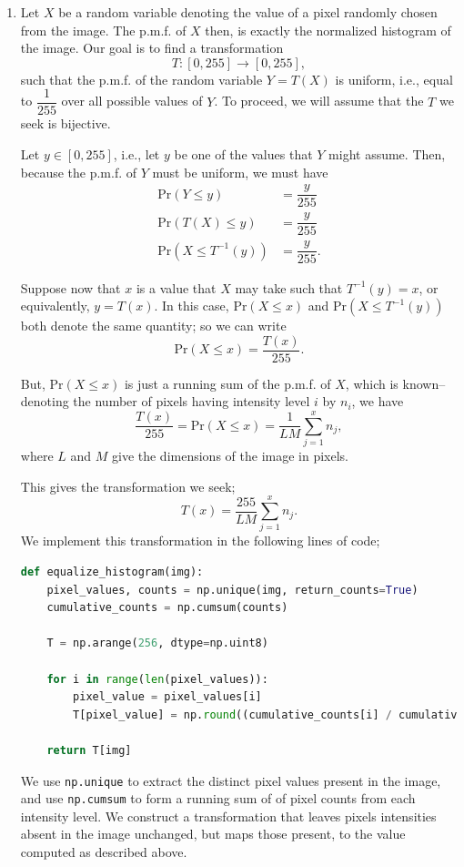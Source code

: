 \documentclass{article}[a4paper]
\begin{document}
\begin{enumerate}
	\item Let $X$ be a random variable denoting the value of a pixel randomly chosen from the image. The p.m.f. of $X$ then, is exactly
	the normalized histogram of the image. Our goal is to find a transformation \[
		T:[0, 255] \to [0, 255],
	\] such that the p.m.f. of the random variable $Y=T(X)$ is uniform, i.e., equal to $\dfrac{1}{255}$ over all possible values of $Y$.
	To proceed, we will assume that the $T$ we seek is bijective.
	
	Let $y \in [0, 255]$, i.e., let $y$ be one of the values that $Y$ might assume. Then, because the p.m.f. of $Y$ must be uniform, we must have
	\begin{align*}
		\text{Pr}\left( Y \leq y \right) &= \dfrac{y}{255} \\
		\text{Pr}\left( T(X) \leq y \right) &= \dfrac{y}{255} \\
		\text{Pr}\left( X \leq T^{-1}(y) \right) &= \dfrac{y}{255}.
	\end{align*}
	
	Suppose now that $x$ is a value that $X$ may take such that $T^{-1}(y) = x$, or equivalently, $y = T(x)$. In this case, $\text{Pr}\left( X \leq x \right)$
	and $\text{Pr}\left( X \leq T^{-1}(y) \right)$ both denote the same quantity; so we can write \[
		\text{Pr}\left( X \leq x \right) = \dfrac{T(x)}{255}.
	\]
	
	But, $\text{Pr}\left( X \leq x \right)$ is just a running sum of the p.m.f. of $X$, which is known--denoting the number of pixels having intensity
	level $i$ by $n_i$, we have \[
		\dfrac{T(x)}{255} = \text{Pr}\left( X \leq x \right) = \dfrac{1}{LM} \sum_{j = 1}^x n_j,
	\] where $L$ and $M$ give the dimensions of the image in pixels.
	
	This gives the transformation we seek; \[
		T(x) = \dfrac{255}{LM} \sum_{j = 1}^x n_j.
	\] We implement this transformation in the following lines of code;
	\begin{lstlisting}[language=Python]
def equalize_histogram(img):
    pixel_values, counts = np.unique(img, return_counts=True)
    cumulative_counts = np.cumsum(counts)

    T = np.arange(256, dtype=np.uint8)

	for i in range(len(pixel_values)):
        pixel_value = pixel_values[i]
        T[pixel_value] = np.round((cumulative_counts[i] / cumulative_counts[-1]) * 255)

    return T[img]
	\end{lstlisting}
	We use \lstinline|np.unique| to extract the distinct pixel values present in the image, and use \lstinline|np.cumsum| to form a running sum of
	of pixel counts from each intensity level. We construct a transformation that leaves pixels intensities absent in the image
	unchanged, but maps those present, to the value computed as described above.


\end{enumerate}
\end{document}
